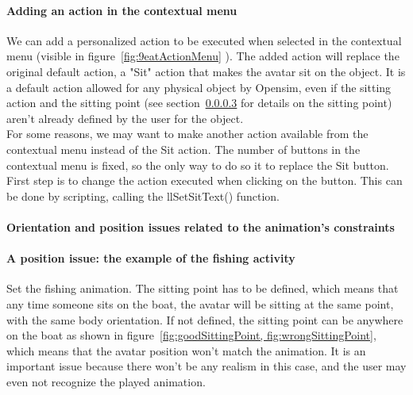 \begin{itemize}
\begin{itemize}
{%

\paragraph{Adding an action in the contextual menu}
\label{sec:setsittext}

We can add a personalized action to be executed when selected in the contextual menu (visible in figure~\ref{fig:9eatActionMenu}%
). The added action will replace the original default action, a "Sit" action that makes the avatar sit on the object. It is a default action allowed for any physical object by Opensim, even if the sitting action and the sitting point (see section~\ref{sittingpoint} for details on the sitting point) aren't already defined by the user for the object. 
\\For some reasons, we may want to make another action available from the contextual menu instead of the Sit action. The number of buttons in the contextual menu is fixed, so the only way to do so it to replace the Sit button. First step is to change the action executed when clicking on the button. This can be done by scripting, calling the llSetSitText() function. 

	\paragraph{Orientation and position issues related to the animation's constraints}

\paragraph{A position issue: the example of the fishing activity}
\label{sittingpoint}


Set the fishing animation.
The sitting point has to be defined, which means that any time someone sits on the boat, the avatar will be sitting at the same point, with the same body orientation. If not defined, the sitting point can be anywhere on the boat as shown in figure~\ref{fig:goodSittingPoint, fig:wrongSittingPoint}, which means that the avatar position won't match the animation. It is an important issue because there won't be any realism in this case, and the user may even not recognize the played animation.

}
\end{itemize}
\end{itemize}
